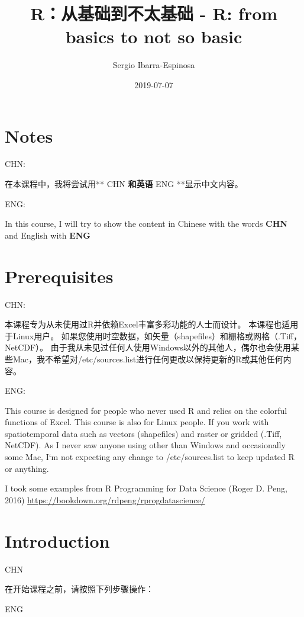 \documentclass[]{book}
\title{R：从基础到不太基础 - R: from basics to not so basic}
\author{Sergio Ibarra-Espinosa}
\date{2019-07-07}
\begin{document}
\maketitle

{
\setcounter{tocdepth}{1}
\tableofcontents
}
\hypertarget{notes}{%
\chapter{Notes}\label{notes}}

CHN:

在本课程中，我将尝试用** CHN \textbf{和英语} ENG **显示中文内容。

ENG:

In this course, I will try to show the content in Chinese with the words \textbf{CHN} and English with \textbf{ENG}

\hypertarget{prerequisites}{%
\chapter{Prerequisites}\label{prerequisites}}

CHN:

本课程专为从未使用过R并依赖Excel丰富多彩功能的人士而设计。
本课程也适用于Linux用户。
如果您使用时空数据，如矢量（shapefiles）和栅格或网格（.Tiff，NetCDF）。
由于我从未见过任何人使用Windows以外的其他人，偶尔也会使用某些Mac，我不希望对/etc/sources.list进行任何更改以保持更新的R或其他任何内容。

ENG:

This course is designed for people who never used R and relies on the colorful functions of Excel.
This course is also for Linux people.
If you work with spatiotemporal data such as vectors (shapefiles) and raster or gridded (.Tiff, NetCDF).
As I never saw anyone using other than Windows and occasionally some Mac, I`m not expecting any change to /etc/sources.list to keep updated R or anything.

I took some examples from R Programming for Data Science (Roger D. Peng, 2016) \url{https://bookdown.org/rdpeng/rprogdatascience/}

\hypertarget{intro}{%
\chapter{Introduction}\label{intro}}

CHN

在开始课程之前，请按照下列步骤操作：

ENG
\end{document}
